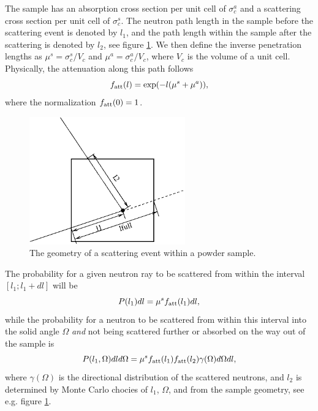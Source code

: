 The sample has an absorption cross section per unit cell of
$\sigma_c^a$ and a scattering cross section per unit cell
of $\sigma_c^s$. The neutron path length
in the sample before the scattering event is denoted by $l_1$, and
the path length within the sample after the scattering
is denoted by $l_2$, see figure \ref{powderFig}.
We then define the inverse penetration lengths as
$\mu^s = \sigma_c^s / V_c$ and $\mu^a = \sigma_c^a / V_c$, where
$V_c$ is the volume of a unit cell. Physically, the attenuation
along this path follows
\begin{equation}
f_{\rm att}(l) = \exp(- l (\mu^s + \mu^a)) ,
\end{equation}
where the normalization $f_{\rm att}(0)=1$.

\begin{figure}
  \begin{center}
    \includegraphics[width=0.6\textwidth]{figures/scatter.eps}
  \end{center}
\caption{The geometry of a scattering event within a powder sample.}
\label{powderFig}
\end{figure}

The probability for a given neutron ray to be scattered from within the interval
$[ l_1 ; l_1+dl ]$ will be
\begin{equation}
P(l_1) dl = \mu^s f_{\rm att}(l_1) dl ,
\end{equation}
while the probability for a neutron to be scattered from within
this interval into the solid angle $\Omega$ {\em and}
not being scattered further
or absorbed on the way out of the sample is
\begin{equation}
P(l_1,\Omega) dl d\Omega =
  \mu^s f_{\rm att}(l_1) f_{\rm att}(l_2) \gamma(\Omega) d\Omega dl ,
\end{equation}
where $\gamma(\Omega)$ is the directional distribution
of the scattered neutrons, and $l_2$ is determined by
Monte Carlo chocies of $l_1$, $\Omega$,
and from the sample geometry, see e.g. figure \ref{powderFig}.

